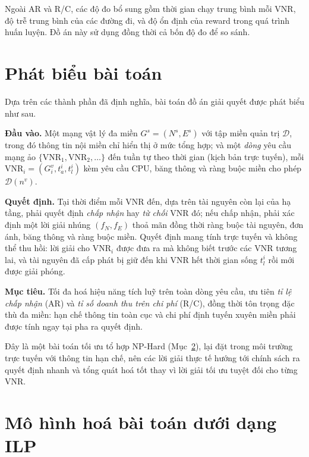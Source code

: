 \documentclass[../DoAn.tex]{subfiles}
\begin{document}
Ngoài AR và R/C, các độ đo bổ sung gồm thời gian chạy trung bình mỗi VNR, độ trễ trung bình của các đường đi, và độ ổn định của reward trong quá trình huấn luyện. Đồ án này sử dụng đồng thời cả bốn độ đo để so sánh.

\section{Phát biểu bài toán}
\label{sec:problem-statement}

Dựa trên các thành phần đã định nghĩa, bài toán đồ án giải quyết được phát biểu như sau.

\textbf{Đầu vào.} Một mạng vật lý đa miền $G^s = (N^s, E^s)$ với tập miền quản trị $\mathcal{D}$, trong đó thông tin nội miền chỉ hiển thị ở mức tổng hợp; và một \textit{dòng} yêu cầu mạng ảo $\{\text{VNR}_1, \text{VNR}_2, \ldots\}$ đến tuần tự theo thời gian (kịch bản trực tuyến), mỗi $\text{VNR}_i = (G^v_i, t_a^i, t_l^i)$ kèm yêu cầu CPU, băng thông và ràng buộc miền cho phép $\mathcal{D}(n^v)$.

\textbf{Quyết định.} Tại thời điểm mỗi VNR đến, dựa trên tài nguyên còn lại của hạ tầng, phải quyết định \textit{chấp nhận} hay \textit{từ chối} VNR đó; nếu chấp nhận, phải xác định một lời giải nhúng $(f_N, f_E)$ thoả mãn đồng thời ràng buộc tài nguyên, đơn ánh, băng thông và ràng buộc miền. Quyết định mang tính trực tuyến và không thể thu hồi: lời giải cho $\text{VNR}_i$ được đưa ra mà không biết trước các VNR tương lai, và tài nguyên đã cấp phát bị giữ đến khi VNR hết thời gian sống $t_l^i$ rồi mới được giải phóng.

\textbf{Mục tiêu.} Tối đa hoá hiệu năng tích luỹ trên toàn dòng yêu cầu, ưu tiên \textit{tỉ lệ chấp nhận} (AR) và \textit{tỉ số doanh thu trên chi phí} (R/C), đồng thời tôn trọng đặc thù đa miền: hạn chế thông tin toàn cục và chi phí định tuyến xuyên miền phải được tính ngay tại pha ra quyết định.

Đây là một bài toán tối ưu tổ hợp NP-Hard (Mục~\ref{sec:ilp}), lại đặt trong môi trường trực tuyến với thông tin hạn chế, nên các lời giải thực tế hướng tới chính sách ra quyết định nhanh và tổng quát hoá tốt thay vì lời giải tối ưu tuyệt đối cho từng VNR.

\section{Mô hình hoá bài toán dưới dạng ILP}
\label{sec:ilp}
\end{document}
